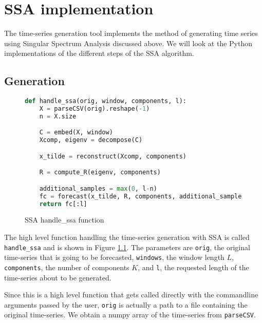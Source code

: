 
\chapter{SSA implementation}\label{chapter:ssa-impl}

The time-series generation tool implements the method of generating time series using Singular Spectrum Analysis discussed above. We will look at the Python implementations of the different steps of the SSA algorithm. \parencite{tsgenerator}

\section{Generation}

\begin{figure}
\begin{singlespace}
\begin{lstlisting}[language=Python]
def handle_ssa(orig, window, components, l):
    X = parseCSV(orig).reshape(-1)
    n = X.size

    C = embed(X, window)
    Xcomp, eigenv = decompose(C)

    x_tilde = reconstruct(Xcomp, components)

    R = compute_R(eigenv, components)

    additional_samples = max(0, l-n)
    fc = forecast(x_tilde, R, components, additional_samples)
    return fc[:l]
\end{lstlisting}
\end{singlespace}
\caption{SSA handle\_ssa function}    
\label{fig:ssa-handle}
\end{figure}

The high level function handling the time-series generation with SSA is called \texttt{handle\_ssa} and is shown in Figure \ref{fig:ssa-handle}. The parameters are \texttt{orig}, the original time-series that is going to be forecasted, \texttt{windows}, the window length $L$, \texttt{components}, the number of components $K$, and \texttt{l}, the requested length of the time-series about to be generated. 

Since this is a high level function that gets called directly with the commandline arguments passed by the user, \texttt{orig} is actually a path to a file containing the original time-series. We obtain a numpy array of the time-series from \texttt{parseCSV}.

